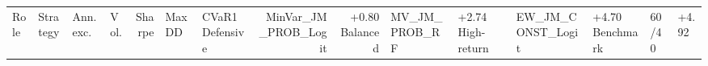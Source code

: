 \begin{tabular}{llllrllrr}
\toprule
Role & Strategy & Ann. exc. & Vol. & Sharpe & Max DD & CVaR1%
\midrule
Defensive & MinVar_JM_PROB_Logit & +0.80%
Balanced & MV_JM_PROB_RF & +2.74%
High-return & EW_JM_CONST_Logit & +4.70%
Benchmark & 60/40 & +4.92%
\bottomrule
\end{tabular}
